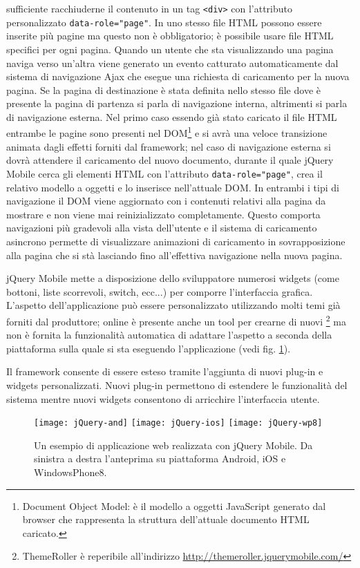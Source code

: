 			sufficiente racchiuderne il contenuto in un tag \verb|<div>| con
			l'attributo personalizzato \verb|data-role="page"|.	In uno stesso
			file HTML possono essere inserite più pagine ma questo non è
			obbligatorio; è possibile usare file HTML specifici per ogni pagina.
			Quando un utente che sta visualizzando una pagina naviga verso
			un'altra viene generato un evento catturato automaticamente dal
			sistema di navigazione Ajax che esegue una richiesta di caricamento
			per la nuova pagina. Se la pagina di destinazione è stata definita
			nello stesso file dove è presente la pagina di partenza si parla di
			navigazione interna, altrimenti si parla di navigazione esterna. Nel
			primo caso essendo già stato caricato il file HTML entrambe le
			pagine sono presenti nel DOM\footnote{Document Object Model: è il
			modello a oggetti JavaScript generato dal browser che rappresenta la
			struttura dell'attuale documento HTML caricato.} e si avrà una
			veloce transizione animata dagli effetti forniti dal framework;
			nel caso di navigazione esterna si dovrà attendere il caricamento
			del nuovo documento, durante il quale jQuery Mobile cerca gli
			elementi HTML con l'attributo \verb|data-role="page"|, crea il
			relativo modello a oggetti e lo inserisce nell'attuale DOM.	In
			entrambi i tipi di navigazione il DOM viene aggiornato con i
			contenuti relativi alla pagina da mostrare e non viene mai
			reinizializzato completamente. Questo comporta navigazioni più
			gradevoli alla vista dell'utente e il sistema di caricamento
			asincrono permette di visualizzare animazioni di caricamento in
			sovrapposizione alla pagina che si stà lasciando fino all'effettiva
			navigazione nella nuova pagina.
			
			jQuery Mobile mette a disposizione dello sviluppatore numerosi
			widgets (come bottoni, liste scorrevoli, switch, ecc...) per
			comporre l'interfaccia grafica. L'aspetto dell'applicazione può
			essere personalizzato utilizzando molti temi già forniti dal
			produttore; online è presente anche un tool per crearne di nuovi
			\footnote{ThemeRoller è reperibile all'indirizzo
			\url{http://themeroller.jquerymobile.com/}} ma non è fornita la
			funzionalità automatica di adattare l'aspetto a seconda della
			piattaforma sulla quale si sta eseguendo l'applicazione (vedi fig.
			\ref{fig:jquery}).
			
			Il framework consente di essere esteso tramite l'aggiunta di nuovi
			plug-in e widgets personalizzati. Nuovi plug-in permettono di
			estendere le funzionalità del sistema mentre nuovi widgets
			consentono di arricchire l'interfaccia utente.
			\begin{figure}[h]
				\centering
				\texttt{[image: jQuery-and]}
				\texttt{[image: jQuery-ios]}
				\texttt{[image: jQuery-wp8]}
				\caption{
					Un esempio di applicazione web realizzata con jQuery Mobile.
					Da sinistra a destra l'anteprima su piattaforma Android, iOS
					e WindowsPhone8.
				}
				\label{fig:jquery}
			\end{figure}
	
